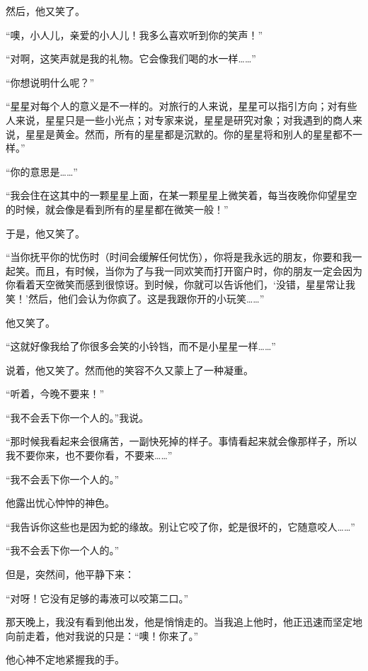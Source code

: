 然后，他又笑了。

“噢，小人儿，亲爱的小人儿！我多么喜欢听到你的笑声！”

“对啊，这笑声就是我的礼物。它会像我们喝的水一样\ldots{}\ldots{}”

“你想说明什么呢？”

“星星对每个人的意义是不一样的。对旅行的人来说，星星可以指引方向；对有些人来说，星星只是一些小光点；对专家来说，星星是研究对象；对我遇到的商人来说，星星是黄金。然而，所有的星星都是沉默的。你的星星将和别人的星星都不一样。”

“你的意思是\ldots{}\ldots{}”

“我会住在这其中的一颗星星上面，在某一颗星星上微笑着，每当夜晚你仰望星空的时候，就会像是看到所有的星星都在微笑一般！”

于是，他又笑了。

“当你抚平你的忧伤时（时间会缓解任何忧伤），你将是我永远的朋友，你要和我一起笑。而且，有时候，当你为了与我一同欢笑而打开窗户时，你的朋友一定会因为你看着天空微笑而感到很惊讶。到时候，你就可以告诉他们，‘没错，星星常让我笑！'然后，他们会认为你疯了。这是我跟你开的小玩笑\ldots{}\ldots{}”

他又笑了。

“这就好像我给了你很多会笑的小铃铛，而不是小星星一样\ldots{}\ldots{}”

说着，他又笑了。然而他的笑容不久又蒙上了一种凝重。

“听着，今晚不要来！”

“我不会丢下你一个人的。”我说。

“那时候我看起来会很痛苦，一副快死掉的样子。事情看起来就会像那样子，所以我不要你来，也不要你看，不要来\ldots{}\ldots{}”

“我不会丢下你一个人的。”

他露出忧心忡忡的神色。

“我告诉你这些也是因为蛇的缘故。别让它咬了你，蛇是很坏的，它随意咬人\ldots{}\ldots{}”

“我不会丢下你一个人的。”

但是，突然间，他平静下来：

“对呀！它没有足够的毒液可以咬第二口。”

那天晚上，我没有看到他出发，他是悄悄走的。当我追上他时，他正迅速而坚定地向前走着，他对我说的只是：“噢！你来了。”

他心神不定地紧握我的手。

{\startalignment[center]
 \stopalignment}


